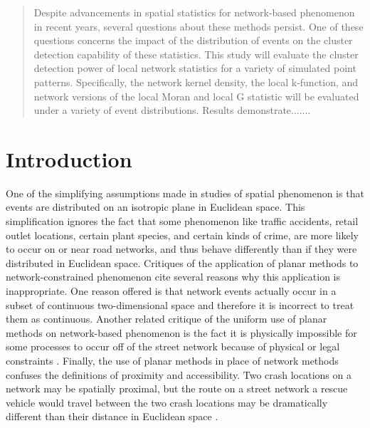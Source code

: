 \documentclass[12pt, letterpaper]{article}
\begin{document}
\maketitle{}
\newpage

\begin{abstract}

Despite advancements in spatial statistics for network-based phenomenon in recent years, several questions about these methods persist. One of these questions concerns the impact of the distribution of events on the cluster detection capability of these statistics. This study will evaluate the cluster detection power of local network statistics for a variety of simulated point patterns. Specifically, the network kernel density, the local k-function, and network versions of the local Moran and local G statistic will be evaluated under a variety of event distributions. Results demonstrate....... %

\end{abstract}
\newpage


\section{Introduction}

One of the simplifying assumptions made in studies of spatial phenomenon is that events are distributed on an isotropic plane in Euclidean space. This simplification ignores the fact that some phenomenon like traffic accidents, retail outlet locations, certain plant species, and certain kinds of crime, are more likely to occur on or near road networks, and thus behave differently than if they were distributed in Euclidean space. Critiques of the application of planar methods to network-constrained phenomenon cite several reasons why this application is inappropriate. One reason offered is that network events actually occur in a subset of continuous two-dimensional space \citep{yamada2004comparison, borruso2008network} and therefore it is incorrect to treat them as continuous. Another related critique of the uniform use of planar methods on network-based phenomenon is the fact it is physically impossible for some processes to occur off of the street network because of physical or legal constraints \citep{yamada2004comparison}. Finally, the use of planar methods in place of network methods confuses the definitions of proximity and accessibility. Two crash locations on a network may be spatially proximal, but the route on a street network a rescue vehicle would travel between the two crash locations may be dramatically different than their distance in Euclidean space \citep{yamada2004comparison}. %
\end{document}
